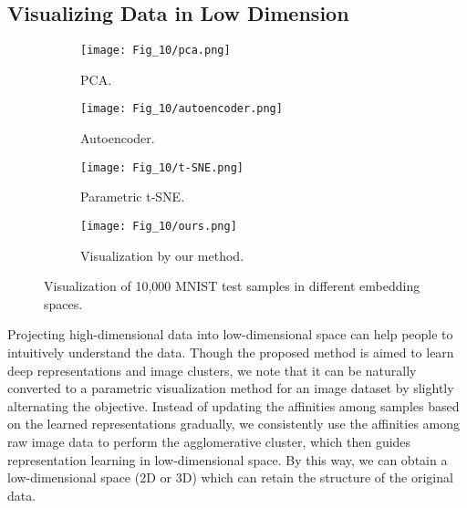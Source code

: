 \documentclass[10pt,twocolumn,letterpaper]{article}
\begin{document}
\subsection{Visualizing Data in Low Dimension}
\begin{figure*}[t]
   \begin{subfigure}{0.24\linewidth}
   \centering
    \texttt{[image: Fig\_10/pca.png]}
    \vspace{-5pt}
    \caption{PCA.}
       \vspace{20pt}
   \end{subfigure}
   \begin{subfigure}{0.24\linewidth}
   \centering
    \texttt{[image: Fig\_10/autoencoder.png]}
    \vspace{-5pt}
    \caption{Autoencoder.}
       \vspace{20pt}
   \end{subfigure}   
   \begin{subfigure}{0.24\linewidth}
   \centering
    \texttt{[image: Fig\_10/t-SNE.png]}
    \vspace{-5pt}
    \caption{Parametric t-SNE.}
       \vspace{20pt}
   \end{subfigure}
   \begin{subfigure}{0.24\linewidth}
   \centering
       \texttt{[image: Fig\_10/ours.png]}
   \vspace{-5pt}
   \caption{Visualization by our method.}
      \vspace{20pt}
   \end{subfigure}
      \vspace{-5pt}
   \caption{Visualization of 10,000 MNIST test samples in different embedding spaces.}
   \label{Fig_PCA_Display_6}
\end{figure*}
Projecting high-dimensional data into low-dimensional space can help people to intuitively understand the data. Though the proposed method is aimed to learn deep representations and image clusters, we note that it can be naturally converted to a parametric visualization method for an image dataset by slightly alternating the objective. Instead of updating the affinities among samples based on the learned representations gradually, we consistently use the affinities among raw image data to perform the agglomerative cluster, which then guides representation learning in low-dimensional space. By this way, we can obtain a low-dimensional space (2D or 3D) which can retain the structure of the original data. 
\end{document}
